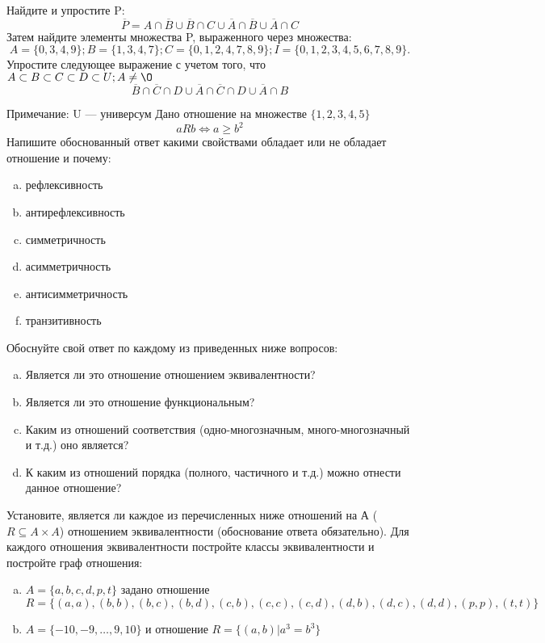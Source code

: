 \documentclass[10pt]{exam}
\begin{document}
\begin{questions}
\question
Найдите и упростите P:
\begin{equation*}
\overline{P} = A \cap \overline{B} \cup \overline{B} \cap C \cup \overline{A} \cap \overline{B} \cup \overline{A} \cap C
\end{equation*}
Затем найдите элементы множества P, выраженного через множества:
\begin{equation*}
A = \{0, 3, 4, 9\}; 
B = \{1, 3, 4, 7\};
C = \{0, 1, 2, 4, 7, 8, 9\};
I = \{0, 1, 2, 3, 4, 5, 6, 7, 8, 9\}.
\end{equation*}\question
Упростите следующее выражение с учетом того, что $A\subset B \subset C \subset D \subset U; A \neq \O$
\begin{equation*}
\overline{B} \cap \overline{C} \cap D \cup \overline{A} \cap \overline{C} \cap D \cup \overline{A} \cap B
\end{equation*}

Примечание: U — универсум\question
Дано отношение на множестве $\{1, 2, 3, 4, 5\}$ 
\begin{equation*}
aRb \iff a \geq b^2
\end{equation*}
Напишите обоснованный ответ какими свойствами обладает или не обладает отношение и почему:   
\begin{enumerate} [a)]\setcounter{enumi}{0}
\item рефлексивность
\item антирефлексивность
\item симметричность
\item асимметричность
\item антисимметричность
\item транзитивность
\end{enumerate}

Обоснуйте свой ответ по каждому из приведенных ниже вопросов:
\begin{enumerate} [a)]\setcounter{enumi}{0}
    \item Является ли это отношение отношением эквивалентности?
    \item Является ли это отношение функциональным?
    \item Каким из отношений соответствия (одно-многозначным, много-многозначный и т.д.) оно является?
    \item К каким из отношений порядка (полного, частичного и т.д.) можно отнести данное отношение?
\end{enumerate}


\question
Установите, является ли каждое из перечисленных ниже отношений на А ($R \subseteq A \times A$) отношением эквивалентности (обоснование ответа обязательно). Для каждого отношения эквивалентности постройте классы 
эквивалентности и постройте граф отношения:
\begin{enumerate} [a)]\setcounter{enumi}{0}
\item $A = \{a, b, c, d, p, t\}$ задано отношение $R = \{(a, a), (b, b), (b, c), (b, d), (c, b), (c, c), (c, d), (d, b), (d, c), (d, d), (p,p), (t,t)\}$
\item $A = \{-10, -9, … , 9, 10\}$ и отношение $R = \{(a,b)|a^{3} = b^{3}\}$


\end{enumerate}
\end{questions}
\end{document}

